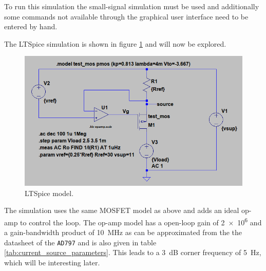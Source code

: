\documentclass[12pt]{book}
\providecommand{\device}[1]{\texttt{\small #1}}
\begin{document}
To run this simulation the small-signal simulation must be used and additionally some commands not available through the graphical user interface need to be entered by hand.

The LTSpice simulation is shown in figure \ref{fig:ltspice_output_impedance_example} and will now be explored.

\begin{figure}[hb]
    \centering
    \includegraphics[width=0.8\linewidth]{../images/ltspice_output_impedance.png}
    \caption{LTSpice model.}
    \label{fig:ltspice_output_impedance_example}
\end{figure}

The simulation uses the same MOSFET model as above and adds an ideal op-amp to control the loop. The op-amp model has a open-loop gain of \num{2e6} and a gain-bandwidth product of \qty{10}{\MHz} as can be approximated from the the datasheet of the \device{AD797} \cite{datasheet_AD797} and is also given in table \ref{tab:current_source_parameters}. This leads to a \qty{3}{\dB} corner frequency of \qty{5}{\Hz}, which will be interesting later.
\end{document}
